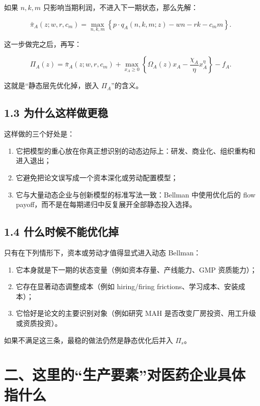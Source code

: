\documentclass[12pt,fontset=none]{ctexart}
\begin{document}
如果 \(n,k,m\) 只影响当期利润，不进入下一期状态，那么先解：

\[
\bar{\pi}_A(z;w,r,c_m)
=
\max_{n,k,m}
\left\{
p\cdot q_A(n,k,m;z)-wn-rk-c_m m
\right\}.
\]

这一步做完之后，再写：

\[
\Pi_A(z)
=
\bar{\pi}_A(z;w,r,c_m)
+
\max_{x_A\ge 0}
\left\{
\Omega_A(z)x_A-\frac{\chi_A}{\eta}x_A^\eta
\right\}
-f_A.
\]

这就是“静态层先优化掉，嵌入 \(\Pi_A\)”的含义。

\subsection{1.3 为什么这样做更稳}

这样做的三个好处是：

\begin{enumerate}[leftmargin=2em]
    \item 它把模型的重心放在你真正想识别的动态边际上：研发、商业化、组织重构和进入退出；
    \item 它避免把论文误写成一个资本深化或劳动配置模型；
    \item 它与大量动态企业与创新模型的标准写法一致：Bellman 中使用优化后的 flow payoff，而不是在每期递归中反复展开全部静态投入选择。
\end{enumerate}

\subsection{1.4 什么时候不能优化掉}

只有在下列情形下，资本或劳动才值得显式进入动态 Bellman：

\begin{enumerate}[leftmargin=2em]
    \item 它本身就是下一期的状态变量（例如资本存量、产线能力、GMP 资质能力）；
    \item 它存在显著动态调整成本（例如 hiring/firing frictions、学习成本、安装成本）；
    \item 它恰好是论文的主要识别对象（例如研究 MAH 是否改变厂房投资、用工升级或资质投资）。
\end{enumerate}

如果不满足这三条，最稳的做法仍然是静态优化后并入 \(\Pi_s\)。

\section{二、这里的“生产要素”对医药企业具体指什么}
\end{document}

